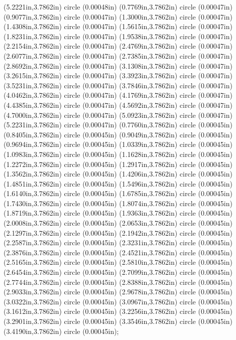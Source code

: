 (5.2221in,3.7862in) circle (0.00048in) (0.7769in,3.7862in) circle (0.00047in) (0.9077in,3.7862in) circle (0.00047in) (1.3000in,3.7862in) circle (0.00047in) (1.4308in,3.7862in) circle (0.00047in) (1.5615in,3.7862in) circle (0.00047in) (1.8231in,3.7862in) circle (0.00047in) (1.9538in,3.7862in) circle (0.00047in) (2.2154in,3.7862in) circle (0.00047in) (2.4769in,3.7862in) circle (0.00047in) (2.6077in,3.7862in) circle (0.00047in) (2.7385in,3.7862in) circle (0.00047in) (2.8692in,3.7862in) circle (0.00047in) (3.1308in,3.7862in) circle (0.00047in) (3.2615in,3.7862in) circle (0.00047in) (3.3923in,3.7862in) circle (0.00047in) (3.5231in,3.7862in) circle (0.00047in) (3.7846in,3.7862in) circle (0.00047in) (4.0462in,3.7862in) circle (0.00047in) (4.1769in,3.7862in) circle (0.00047in) (4.4385in,3.7862in) circle (0.00047in) (4.5692in,3.7862in) circle (0.00047in) (4.7000in,3.7862in) circle (0.00047in) (5.0923in,3.7862in) circle (0.00047in) (5.2231in,3.7862in) circle (0.00047in) (0.7760in,3.7862in) circle (0.00045in) (0.8405in,3.7862in) circle (0.00045in) (0.9049in,3.7862in) circle (0.00045in) (0.9694in,3.7862in) circle (0.00045in) (1.0339in,3.7862in) circle (0.00045in) (1.0983in,3.7862in) circle (0.00045in) (1.1628in,3.7862in) circle (0.00045in) (1.2272in,3.7862in) circle (0.00045in) (1.2917in,3.7862in) circle (0.00045in) (1.3562in,3.7862in) circle (0.00045in) (1.4206in,3.7862in) circle (0.00045in) (1.4851in,3.7862in) circle (0.00045in) (1.5496in,3.7862in) circle (0.00045in) (1.6140in,3.7862in) circle (0.00045in) (1.6785in,3.7862in) circle (0.00045in) (1.7430in,3.7862in) circle (0.00045in) (1.8074in,3.7862in) circle (0.00045in) (1.8719in,3.7862in) circle (0.00045in) (1.9363in,3.7862in) circle (0.00045in) (2.0008in,3.7862in) circle (0.00045in) (2.0653in,3.7862in) circle (0.00045in) (2.1297in,3.7862in) circle (0.00045in) (2.1942in,3.7862in) circle (0.00045in) (2.2587in,3.7862in) circle (0.00045in) (2.3231in,3.7862in) circle (0.00045in) (2.3876in,3.7862in) circle (0.00045in) (2.4521in,3.7862in) circle (0.00045in) (2.5165in,3.7862in) circle (0.00045in) (2.5810in,3.7862in) circle (0.00045in) (2.6454in,3.7862in) circle (0.00045in) (2.7099in,3.7862in) circle (0.00045in) (2.7744in,3.7862in) circle (0.00045in) (2.8388in,3.7862in) circle (0.00045in) (2.9033in,3.7862in) circle (0.00045in) (2.9678in,3.7862in) circle (0.00045in) (3.0322in,3.7862in) circle (0.00045in) (3.0967in,3.7862in) circle (0.00045in) (3.1612in,3.7862in) circle (0.00045in) (3.2256in,3.7862in) circle (0.00045in) (3.2901in,3.7862in) circle (0.00045in) (3.3546in,3.7862in) circle (0.00045in) (3.4190in,3.7862in) circle (0.00045in);
